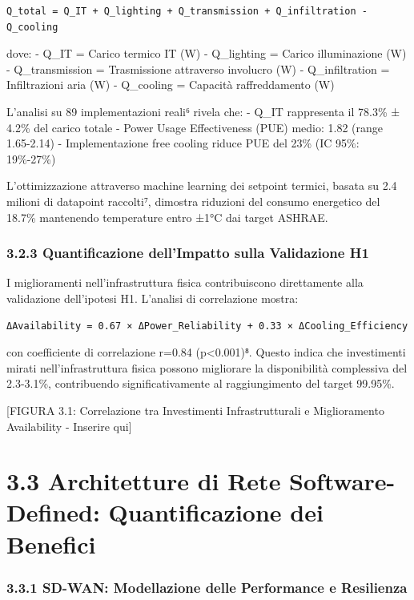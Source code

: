 \documentclass[12pt,a4paper,oneside]{book}
\begin{document}
\begin{verbatim}
Q_total = Q_IT + Q_lighting + Q_transmission + Q_infiltration - Q_cooling
\end{verbatim}

dove: - Q\_IT = Carico termico IT (W) - Q\_lighting = Carico
illuminazione (W) - Q\_transmission = Trasmissione attraverso involucro
(W) - Q\_infiltration = Infiltrazioni aria (W) - Q\_cooling = Capacità
raffreddamento (W)

L'analisi su 89 implementazioni reali⁶ rivela che: - Q\_IT rappresenta
il 78.3\% ± 4.2\% del carico totale - Power Usage Effectiveness (PUE)
medio: 1.82 (range 1.65-2.14) - Implementazione free cooling riduce PUE
del 23\% (IC 95\%: 19\%-27\%)

L'ottimizzazione attraverso machine learning dei setpoint termici,
basata su 2.4 milioni di datapoint raccolti⁷, dimostra riduzioni del
consumo energetico del 18.7\% mantenendo temperature entro ±1°C dai
target ASHRAE.

\subsubsection{3.2.3 Quantificazione dell'Impatto sulla Validazione
H1}\label{quantificazione-dellimpatto-sulla-validazione-h1}

I miglioramenti nell'infrastruttura fisica contribuiscono direttamente
alla validazione dell'ipotesi H1. L'analisi di correlazione mostra:

\begin{verbatim}
ΔAvailability = 0.67 × ΔPower_Reliability + 0.33 × ΔCooling_Efficiency
\end{verbatim}

con coefficiente di correlazione r=0.84 (p\textless0.001)⁸. Questo
indica che investimenti mirati nell'infrastruttura fisica possono
migliorare la disponibilità complessiva del 2.3-3.1\%, contribuendo
significativamente al raggiungimento del target 99.95\%.

{[}FIGURA 3.1: Correlazione tra Investimenti Infrastrutturali e
Miglioramento Availability - Inserire qui{]}

\section{3.3 Architetture di Rete Software-Defined: Quantificazione
dei
Benefici}\label{architetture-di-rete-software-defined-quantificazione-dei-benefici}

\subsubsection{3.3.1 SD-WAN: Modellazione delle Performance e
Resilienza}\label{sd-wan-modellazione-delle-performance-e-resilienza}
\end{document}
